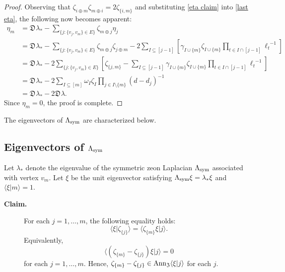 \documentclass{article}
\theoremstyle{definition}
\newcommand{\zdu}{\mathfrak{D}\mspace{1mu}}
\newcommand{\Z}{\mathfrak{Z}}
\newcommand{\Ann}{{\rm Ann}_{\Z}}
\numberwithin{equation}{section}
\begin{document}
\begin{proof}
Observing that $\zeta_{i\oplus m}\zeta_{m\oplus i}=2\zeta_{\{i,m\}}$ and substituting \eqref{eta claim} into \eqref{last eta}, the following now becomes apparent:
\begin{align*}
 \eta_m&=\zdu\lambda_*-\sum_{\{j: \{v_j,v_m\}\in E\}}\zeta_{m\oplus j}\eta_j\\
 &=\zdu\lambda_*-\sum_{\{j: \{v_j,v_m\}\in E\}}\zeta_{m\oplus j}\zeta_{j\oplus m}-2\sum_{I\subseteq [j-1]}\left[\gamma_{I\cup\{m\}}\zeta_{I\cup\{m\}}\prod_{t\in I\cap[j-1]}{\ell_t}^{-1}\right]\\
 &=\zdu\lambda_*-2\sum_{\{j: \{v_j,v_m\}\in E\}}\left[\zeta_{\{j,m\}}-\sum_{I\subseteq [j-1]}\gamma_{I\cup\{m\}}\zeta_{I\cup\{m\}}\prod_{t\in I\cap[j-1]}{\ell_t}^{-1}\right]\\
 &=\zdu\lambda_*-2\sum_{I\subseteq[m]}\omega_I\zeta_I\prod_{j\in I\setminus\{m\}}(d-d_j)^{-1}\\
 &=\zdu\lambda_*-2\zdu \lambda.
 \end{align*}
Since $\eta_m=0$, the proof is complete.
\end{proof}

The eigenvectors of $\Lambda_{\rm sym}$ are characterized below. 

\subsection*{Eigenvectors of $\Lambda_{\rm sym}$}

Let $\lambda_*$ denote the eigenvalue of the symmetric zeon Laplacian $\Lambda_{\rm sym}$ associated with vertex $v_m$.  Let $\xi$ be the unit eigenvector satisfying $\Lambda_{\rm sym} \xi=\lambda_*\xi$ and $\langle \xi\vert m\rangle=1$.

\begin{description}
\item[{\bf Claim.}] For each $j=1, \ldots, m$, the following equality holds:
\begin{equation*}
\langle \xi\vert \zeta_{\{j\}}\rangle = \langle \zeta_{\{m\}}\xi\vert j\rangle.
\end{equation*}
Equivalently, 
\begin{equation*}
\langle (\zeta_{\{m\}}-\zeta_{\{j\}})\xi\vert j\rangle = 0
\end{equation*}
for each $j=1, \ldots, m$.  Hence, $\zeta_{\{m\}}-\zeta_{\{j\}}\in\Ann \langle\xi\vert j\rangle$ for each $j$.

\end{description}
\end{document}
